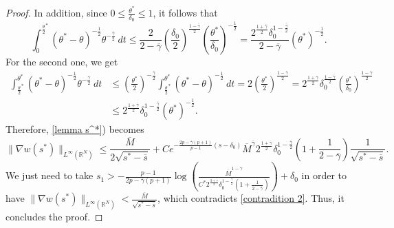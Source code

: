 \documentclass[11pt,a4paper]{article}
\newcommand{\1}{\mathbbm{1}}
\numberwithin{equation}{section}
\newcommand{\numberset}{\mathbb}
\newcommand{\R}{\numberset{R}}
\theoremstyle{remark}
\begin{document}
\begin{proof}
In addition, since $0\leq \frac{\theta^*}{\delta_0}\leq 1$, it follows that
$$\int^{\frac{\theta}{2}^*}_0 (\theta^*-\theta)^{-\frac{1}{2}}\theta^{-\frac{\overline{\gamma}}{2}}\ dt\leq \frac{2}{2-\overline{\gamma}}\left(\frac{\delta_0}{2}\right)^{\frac{1-\overline{\gamma}}{2}}\left(\frac{\theta^*}{\delta_0}\right)^{-\frac{1}{2}}=\frac{2^{\frac{1+\overline{\gamma}}{2}}\delta_0^{1-\frac{\overline{\gamma}}{2}}}{2-\overline{\gamma}}(\theta^*)^{-\frac{1}{2}}.$$
For the second one, we get 
\begin{equation*}
\begin{split}
\int_{\frac{\theta}{2}^*}^{\theta^*} (\theta^*-\theta)^{-\frac{1}{2}}\theta^{-\frac{\overline{\gamma}}{2}}\ dt &\leq \left(\frac{\theta^*}{2}\right)^{-\frac{\overline{\gamma}}{2}}\int_{\frac{\theta}{2}^*}^{\theta^*} (\theta^*-\theta)^{-\frac{1}{2}}\ dt=2\left(\frac{\theta^*}{2}\right)^{\frac{1-\overline{\gamma}}{2}}=2^{\frac{1+\overline{\gamma}}{2}}\delta_0^{\frac{1-\overline{\gamma}}{2}}\left(\frac{\theta^*}{\delta_0}\right)^{\frac{1-\overline{\gamma}}{2}}\\
&\leq 2^{\frac{1+\overline{\gamma}}{2}}\delta_0^{1-\frac{\overline{\gamma}}{2}}(\theta^*)^{-\frac{1}{2}}.
\end{split}
\end{equation*}
Therefore, \eqref{lemma s^*}) becomes
\begin{equation*}
\|\nabla w(s^*)\|_{L^\infty(\R^N)}\leq \frac{\overline{M}}{2\sqrt{s^*-\overline{s}}}+Ce^{-\frac{2p-\overline{\gamma}(p+1)}{p-1}(s-\delta_0)}\overline{M}^{\overline{\gamma}}2^{\frac{1+\overline{\gamma}}{2}}\delta_0^{1-\frac{\overline{\gamma}}{2}}\left(1+\frac{1}{2-\overline{\gamma}}\right)\frac{1}{\sqrt{s^*-\overline{s}}}.
\end{equation*}
We just need to take $s_1>-\frac{p-1}{2p-\overline{\gamma}(p+1)}\log \left(\frac{\overline{M}^{1-\overline{\gamma}}}{C^*2^{\frac{3+\overline{\gamma}}{2}}\delta_0^{1-\frac{\overline{\gamma}}{2}}(1+\frac{1}{2-\overline{\gamma}})}\right)+\delta_0$ in order to have $\|\nabla w(s^*)\|_{L^\infty(\R^N)}< \frac{\overline{M}}{\sqrt{s^*-\overline{s}}}$, which contradicts \eqref{contradition 2}. Thus, it concludes the proof.
\end{proof}
\end{document}
